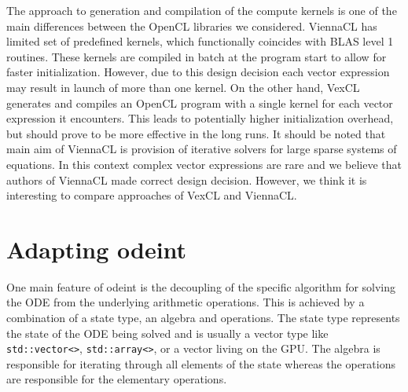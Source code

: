 \documentclass[1p]{elsarticle}
\newcommand{\code}[1]{\lstinline|#1|}
\begin{document}
The approach to generation and compilation of the compute kernels is one of the
main differences between the OpenCL libraries we considered.  ViennaCL has
limited set of predefined kernels, which functionally coincides with BLAS level
1 routines.  These kernels are compiled in batch at the program start to allow
for faster initialization. However, due to this design decision each vector
expression may result in launch of more than one kernel.  On the other hand,
VexCL generates and compiles an OpenCL program with a single kernel for each
vector expression it encounters.  This leads to potentially higher
initialization overhead, but should prove to be more effective in the long
runs. It should be noted that main aim of ViennaCL is provision of iterative
solvers for large sparse systems of equations. In this context complex vector
expressions are rare and we believe that authors of ViennaCL made correct
design decision.  However, we think it is interesting to compare approaches of
VexCL and ViennaCL.







%
%
\section{Adapting odeint}

One main feature of odeint is the decoupling of the specific algorithm
for solving the ODE from the underlying arithmetic operations. This
is achieved by a combination of a state type, an algebra and
operations. The state type represents the state of the ODE being
solved and is usually a vector type like \code{std::vector<>},
\code{std::array<>}, or a vector living on the GPU. The algebra is
responsible for iterating through all elements of the state whereas
the operations are responsible for the elementary operations.
\end{document}
